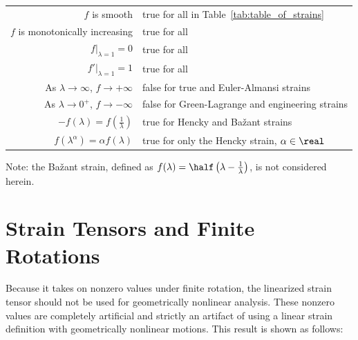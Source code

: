 \begin{tabular}{rl}
$f$ is smooth & true for all in Table~\ref{tab:table_of_strains} \\
$f$ is monotonically increasing & true for all \\
$\left. f \right|_{\lambda = 1} = 0$ & true for all \\
$\left. f' \right|_{\lambda = 1} = 1$ & true for all \\
As $\lambda \rightarrow \infty$, $f \rightarrow +\infty$ & false for true
and
Euler-Almansi strains \\
As $\lambda \rightarrow 0^+$, $f \rightarrow -\infty$ & false for 
Green-Lagrange and engineering strains \\
$-f(\lambda) = f\left(\frac{1}{\lambda}\right)$ & 
true for Hencky and Ba\v{z}ant strains \\
$f(\lambda^{\alpha}) = \alpha f(\lambda)$ & true for only the Hencky strain, 
$\alpha \in \real$
\end{tabular}


Note: the Ba\v{z}ant strain, 
defined as $f(\lambda) = \half\left(\lambda - \frac{1}{\lambda}\right)$, 
is not considered herein.
\clearpage

\section{Strain Tensors and Finite Rotations}
\label{section:rb_rotation_strain}

Because it takes on nonzero values under finite rotation,
the linearized strain tensor 
should not be used for geometrically nonlinear analysis.
These nonzero values are completely artificial and strictly
an artifact of using a linear strain definition with
geometrically nonlinear motions.   This result is shown as follows:

